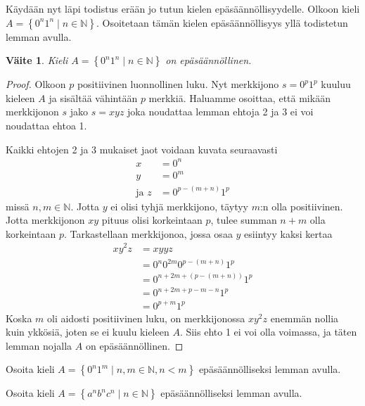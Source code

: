\documentclass[a4paper,11pt]{article}
\newtheorem*{claim}{Väite}
\theoremstyle{definition}
\newcommand{\set}[1]{{\left\{ #1 \right\}}}
\newcommand{\Nat}{\mathbb{N}}
\begin{document}
Käydään nyt läpi todistus erään jo tutun kielen epäsäännöllisyydelle.
Olkoon kieli $A = \set{0^n1^n \mid n \in \Nat}$. Osoitetaan tämän
kielen epäsäännöllisyys yllä todistetun lemman avulla.
%
\begin{claim}
    Kieli $A = \set{0^n1^n \mid n \in \Nat}$ on epäsäännöllinen.
\end{claim}
\begin{proof}
    Olkoon $p$ positiivinen luonnollinen luku. Nyt merkkijono $s =
    0^p1^p$ kuuluu kieleen $A$ ja sisältää vähintään $p$ merkkiä.
    Haluamme osoittaa, että mikään merkkijonon $s$ jako $s = xyz$ joka
    noudattaa lemman ehtoja 2 ja 3 ei voi noudattaa ehtoa 1.

    Kaikki ehtojen 2 ja 3 mukaiset jaot voidaan kuvata seuraavasti
    \begin{align*}
      x & = 0^n \\
      y & = 0^m \\
      \text{ja } z & = 0^{p-(m+n)}1^p
    \end{align*}
    missä $n,m \in \Nat$. Jotta $y$ ei olisi tyhjä merkkijono, täytyy
    $m$:n olla positiivinen. Jotta merkkijonon $xy$ pituus olisi
    korkeintaan $p$, tulee summan $n + m$ olla korkeintaan $p$.
    Tarkastellaan merkkijonoa, jossa osaa $y$ esiintyy kaksi kertaa
    \begin{align*}
      xy^2z & = xyyz \\
      & = 0^n0^{2m}0^{p-(m+n)}1^p \\
      & = 0^{n+2m+(p-(m+n))}1^p \\
      & = 0^{n+2m+p-m-n}1^p \\
      & = 0^{p+m}1^p
    \end{align*}
    Koska $m$ oli aidosti positiivinen luku, on merkkijonossa $xy^2z$
    enemmän nollia kuin ykkösiä, joten se ei kuulu kieleen $A$. Siis
    ehto 1 ei voi olla voimassa, ja täten lemman nojalla $A$ on
    epäsäännöllinen.
\end{proof}

\begin{exercise}
  Osoita kieli $A = \set{0^n1^m \mid n,m \in \Nat, n < m}$
  epäsäännölliseksi lemman avulla.
\end{exercise}

\vspace{5mm}

\begin{exercise}
  Osoita kieli $A = \set{a^nb^nc^n \mid n \in \Nat}$ epäsäännölliseksi
  lemman avulla.
\end{exercise}
\end{document}
